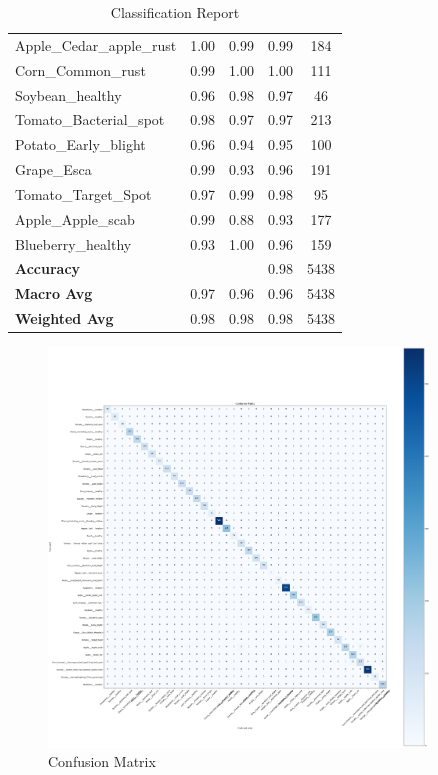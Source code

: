 \begin{table}[H]
\begin{tabular}{lcccc}
		Apple\_Cedar\_apple\_rust & 1.00 & 0.99 & 0.99 & 184 \\
		Corn\_Common\_rust & 0.99 & 1.00 & 1.00 & 111 \\
		Soybean\_healthy & 0.96 & 0.98 & 0.97 & 46 \\
		Tomato\_Bacterial\_spot & 0.98 & 0.97 & 0.97 & 213 \\
		Potato\_Early\_blight & 0.96 & 0.94 & 0.95 & 100 \\
		Grape\_Esca & 0.99 & 0.93 & 0.96 & 191 \\
		Tomato\_Target\_Spot & 0.97 & 0.99 & 0.98 & 95 \\
		Apple\_Apple\_scab & 0.99 & 0.88 & 0.93 & 177 \\
		Blueberry\_healthy & 0.93 & 1.00 & 0.96 & 159 \\
		\hline
		\textbf{Accuracy} & & & 0.98 & 5438 \\
		\textbf{Macro Avg} & 0.97 & 0.96 & 0.96 & 5438 \\
		\textbf{Weighted Avg} & 0.98 & 0.98 & 0.98 & 5438 \\
		\hline
	\end{tabular}
	\caption{Classification Report}
\end{table}

\begin{figure}[H]
    \centering
    \includegraphics[width= 0.9\textwidth]{assets/FSConfMatrix.png} 
    \caption{Confusion Matrix} 
    \label{fig:immagine}
\end{figure}

